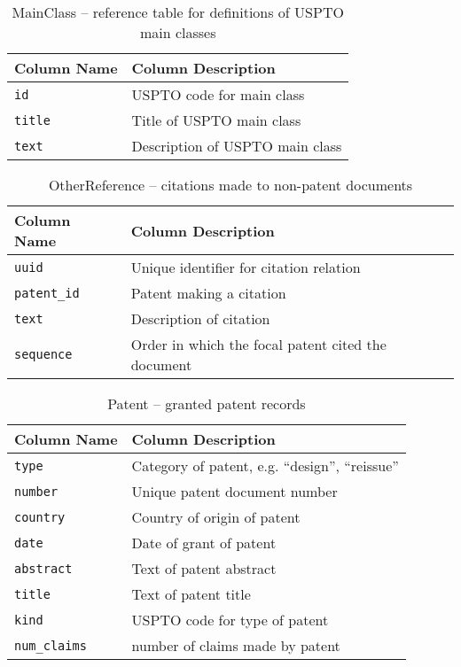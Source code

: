 \begin{table}[ht]
\center
\begin{tabular}{| l | l |}
\hline
Column Name & Column Description \\
\hline
\verb`id` & USPTO code for main class \\
\verb`title` & Title of USPTO main class \\
\verb`text` & Description of USPTO main class \\
\hline
\end{tabular}
\caption{MainClass -- reference table for definitions of USPTO main classes}
\end{table}

\begin{table}[ht]
\center
\begin{tabular}{| l | l |}
\hline
Column Name & Column Description \\
\hline
\verb`uuid` & Unique identifier for citation relation \\
\verb`patent_id` & Patent making a citation \\
\verb`text` & Description of citation \\
\verb`sequence` & Order in which the focal patent cited the document \\
\hline
\end{tabular}
\caption{OtherReference -- citations made to non-patent documents}
\end{table}

\begin{table}[ht]
\center
\begin{tabular}{| l | l |}
\hline
Column Name & Column Description \\
\hline
\verb`type` & Category of patent, e.g. ``design'', ``reissue'' \\
\verb`number` & Unique patent document number \\
\verb`country` & Country of origin of patent \\
\verb`date` & Date of grant of patent \\
\verb`abstract` & Text of patent abstract \\
\verb`title` & Text of patent title \\
\verb`kind` & USPTO code for type of patent \\
\verb`num_claims` & number of claims made by patent \\
\hline
\end{tabular}
\caption{Patent -- granted patent records}
\end{table}

